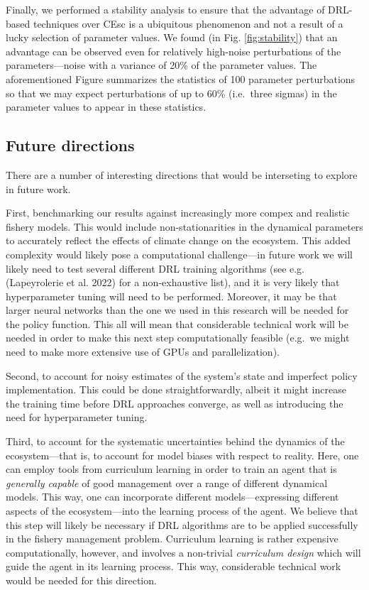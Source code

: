 \documentclass{article}
\begin{document}
Finally, we performed a stability analysis to ensure that the advantage
of DRL-based techniques over CEsc is a ubiquitous phenomenon and not a
result of a lucky selection of parameter values. We found (in Fig.
\ref{fig:stability}) that an advantage can be observed even for
relatively high-noise perturbations of the parameters---noise with a
variance of 20\% of the parameter values. The aforementioned Figure
summarizes the statistics of 100 parameter perturbations so that we may
expect perturbations of up to 60\% (i.e.~three sigmas) in the parameter
values to appear in these statistics.

\hypertarget{future-directions}{%
\subsection{Future directions}\label{future-directions}}

There are a number of interesting directions that would be interseting
to explore in future work.

First, benchmarking our results against increasingly more compex and
realistic fishery models. This would include non-stationarities in the
dynamical parameters to accurately reflect the effects of climate change
on the ecosystem. This added complexity would likely pose a
computational challenge---in future work we will likely need to test
several different DRL training algorithms (see e.g. (Lapeyrolerie et al.
2022) for a non-exhaustive list), and it is very likely that
hyperparameter tuning will need to be performed. Moreover, it may be
that larger neural networks than the one we used in this research will
be needed for the policy function. This all will mean that considerable
technical work will be needed in order to make this next step
computationally feasible (e.g.~we might need to make more extensive use
of GPUs and parallelization).

Second, to account for noisy estimates of the system's state and
imperfect policy implementation. This could be done straightforwardly,
albeit it might increase the training time before DRL approaches
converge, as well as introducing the need for hyperparameter tuning.

Third, to account for the systematic uncertainties behind the dynamics
of the ecosystem---that is, to account for model biases with respect to
reality. Here, one can employ tools from curriculum learning in order to
train an agent that is \emph{generally capable} of good management over
a range of different dynamical models. This way, one can incorporate
different models---expressing different aspects of the ecosystem---into
the learning process of the agent. We believe that this step will likely
be necessary if DRL algorithms are to be applied successfully in the
fishery management problem. Curriculum learning is rather expensive
computationally, however, and involves a non-trivial \emph{curriculum
design} which will guide the agent in its learning process. This way,
considerable technical work would be needed for this direction.
\end{document}
